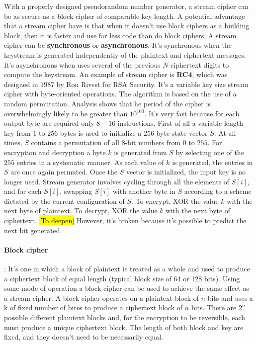 \documentclass[11pt]{article}
\begin{document}
With a properly designed pseudorandom number generator, a stream cipher can be as secure as a block cipher of comparable key length. A potential advantage that a stream cipher have is that when it doesn't use block ciphers as a building block, then it is faster and use far less code than do block ciphers. A stream cipher can be \textbf{synchronous} or \textbf{asynchronous}. It's synchronous when the keystream is generated independently of the plaintext and ciphertext messages. It's asynchronous when uses several of the previous $N$ ciphertext digits to compute the keystream. An example of stream cipher is \textbf{RC4}, which was designed in $1987$ by Ron Rivest for RSA Security. It's a variable key size stream cipher with byte-oriented operations. The algorithm is based on the use of a random permutation. Analysis shows that he period of the cipher is overwhelmingly likely to be greater than $10^{100}$. It's very fast because for each output byte are required only $8-16$ instructions. First of all a variable-length key from $1$ to $256$ bytes is used to initialize a $256$-byte state vector $S$. At all times, $S$ contains a permutation of all $8$-bit numbers from $0$ to $255$. For encryption and decryption a byte $k$ is generated from $S$ by selecting one of the $255$ entries in a systematic manner. As each value of $k$ is generated, the entries in $S$ are once again permuted. Once the $S$ vector is initialized, the input key is no longer used. Stream generator involves cycling through all the elements of $S[i]$, and for each $S[i]$, swapping $S[i]$ with another byte in $S$ according to a scheme dictated by the current configuration of $S$. To encrypt, XOR the value $k$ with the next byte of plaintext. To decrypt, XOR the value $k$ with the next byte of ciphertext.  \hl{[To deepen]} However, it's broken because it's possible to predict the next bit generated.
\paragraph{Block cipher} : It's one in which a block of plaintext is treated as a whole and used to produce a ciphertext block of equal length (typical block size of 64 or 128 bits). Using some mode of operation a block cipher can be used to achieve the same effect as a stream cipher. A block cipher operates on a plaintext block of $n$ bits and uses a k of fixed number of bites to produce a ciphertext block of $n$ bits. There are $2^{n}$ possible different plaintext blocks and, for the encryption to be reversible, each must produce a unique ciphertext block. The length of both block and key are fixed, and they doesn't need to be necessarily equal.
\end{document}
